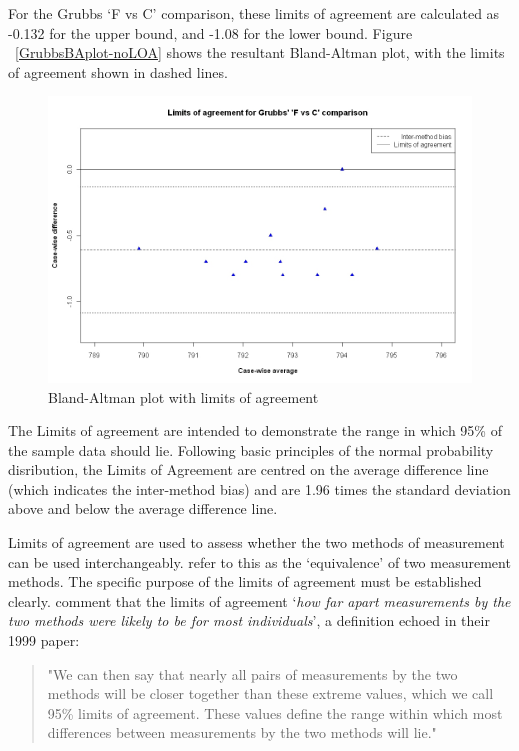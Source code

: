 \documentclass[12pt, a4paper]{report}
\theoremstyle{plain}
\theoremstyle{definition}
\theoremstyle{remark}
\begin{document}
For the Grubbs `F vs C' comparison, these limits
of agreement are calculated as -0.132 for the upper bound, and
-1.08 for the lower bound. Figure ~\ref{GrubbsBAplot-noLOA} shows the resultant
Bland-Altman plot, with the limits of agreement shown in dashed
lines.


\begin{figure}[h!]
	\begin{center}
		\includegraphics[width=125mm]{images/GrubbsBAplot-LOA.jpeg}
		\caption{Bland-Altman plot with limits of agreement}
	\end{center}
\end{figure}

The Limits of agreement are intended to demonstrate the range in which 95\% of the
sample data should lie. Following basic principles of the normal probability disribution, the Limits of Agreement are centred on the
average difference line (which indicates the inter-method bias) and are 1.96 times the standard deviation
above and below the average difference line.

Limits of agreement are used to assess whether the two methods of
measurement can be used interchangeably. \citet{BA86} refer to
this as the `equivalence' of two measurement methods. The specific purpose of the limits of
agreement must be
established clearly. \citet*{BA95} comment that the limits of agreement `\textit{how
	far apart measurements by the two methods were likely to be for
	most individuals}', a definition echoed in their 1999 paper:

\begin{quote}"We can then say that nearly all pairs
	of measurements by the two methods will be closer together than
	these extreme values, which we call 95\% limits of agreement.
	These values define the range within which most differences
	between measurements by the two methods will lie."
\end{quote}
\end{document}
